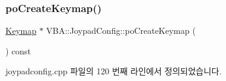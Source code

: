 \mbox{\label{class_v_b_a_1_1_joypad_config_a959ba3641c366cf9acae6bf03990fcfb}} 
\subsubsection{\texorpdfstring{po\+Create\+Keymap()}{poCreateKeymap()}}
{\footnotesize\ttfamily \mbox{\hyperlink{class_v_b_a_1_1_keymap}{Keymap}} $\ast$ V\+B\+A\+::\+Joypad\+Config\+::po\+Create\+Keymap (\begin{DoxyParamCaption}{ }\end{DoxyParamCaption}) const}



joypadconfig.\+cpp 파일의 120 번째 라인에서 정의되었습니다.


